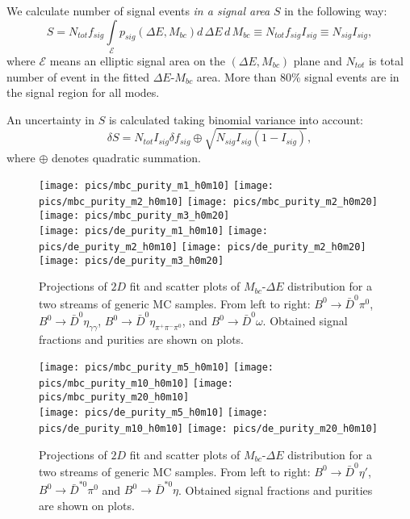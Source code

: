 \documentclass[preprint,aps,showpacs]{revtex4}
\newcommand{\bdpi}{\ensuremath{B^0\to \bar D^0\pi^0}\xspace}
\newcommand{\bdetagg}{\ensuremath{B^0\to \bar D^0\eta_{\gamma\gamma}}\xspace}
\newcommand{\bdetap}{\ensuremath{B^0\to \bar D^0\eta\prime}\xspace}
\newcommand{\bdetappp}{\ensuremath{B^0\to \bar D^0\eta_{\pi^+\pi^-\pi^0}}\xspace}
\newcommand{\bdomega}{\ensuremath{B^0\to \bar D^0\omega}\xspace}
\newcommand{\btodstpi}{\ensuremath{B^0\to \bar D^{*0}\pi^0}\xspace}
\newcommand{\btodsteta}{\ensuremath{B^0\to \bar D^{*0}\eta}\xspace}
\newcommand{\de}{\ensuremath{\Delta E}\xspace}
\newcommand{\mbc}{\ensuremath{M_{bc}}\xspace}
\begin{document}
We calculate number of signal events {\it in a signal area} $S$ in the following way:
\begin{equation}
 S = N_{tot}f_{sig}\int\limits_{\mathcal{E}}p_{sig}(\de,\mbc)d\,\de\,d\,\mbc\equiv N_{tot}f_{sig}I_{sig}\equiv N_{sig}I_{sig},
\end{equation}
where $\mathcal{E}$ means an elliptic signal area on the $(\de,\mbc)$ plane and $N_{tot}$ is total number of event in the fitted \de-\mbc area. More than $80\%$ signal events are in the signal region for all modes.

An uncertainty in $S$ is calculated taking binomial variance into account:
\begin{equation}
 \delta S = N_{tot}I_{sig}\delta f_{sig} \oplus \sqrt{N_{sig}I_{sig}(1-I_{sig})},
\end{equation}
where $\oplus$ denotes quadratic summation.

\begin{figure}[htb]
 \texttt{[image: pics/mbc\_purity\_m1\_h0m10]}
 \texttt{[image: pics/mbc\_purity\_m2\_h0m10]}
 \texttt{[image: pics/mbc\_purity\_m2\_h0m20]}
 \texttt{[image: pics/mbc\_purity\_m3\_h0m20]}\\
 \texttt{[image: pics/de\_purity\_m1\_h0m10]}
 \texttt{[image: pics/de\_purity\_m2\_h0m10]}
 \texttt{[image: pics/de\_purity\_m2\_h0m20]}
 \texttt{[image: pics/de\_purity\_m3\_h0m20]}
 \caption{Projections of $2D$ fit and scatter plots of \mbc-\de distribution for a two streams of generic MC samples. From left to right: \bdpi, \bdetagg, \bdetappp, and \bdomega. Obtained signal fractions and purities are shown on plots.}
\label{fig:de-mbc-pur}
\end{figure}

\begin{figure}[htb]
 \texttt{[image: pics/mbc\_purity\_m5\_h0m10]}
 \texttt{[image: pics/mbc\_purity\_m10\_h0m10]}
 \texttt{[image: pics/mbc\_purity\_m20\_h0m10]}\\
 \texttt{[image: pics/de\_purity\_m5\_h0m10]}
 \texttt{[image: pics/de\_purity\_m10\_h0m10]}
 \texttt{[image: pics/de\_purity\_m20\_h0m10]}
 \caption{Projections of $2D$ fit and scatter plots of \mbc-\de distribution for a two streams of generic MC samples. From left to right: \bdetap, \btodstpi and \btodsteta. Obtained signal fractions and purities are shown on plots.}
\label{fig:de-mbc-pur-prime-star}
\end{figure}
\end{document}
